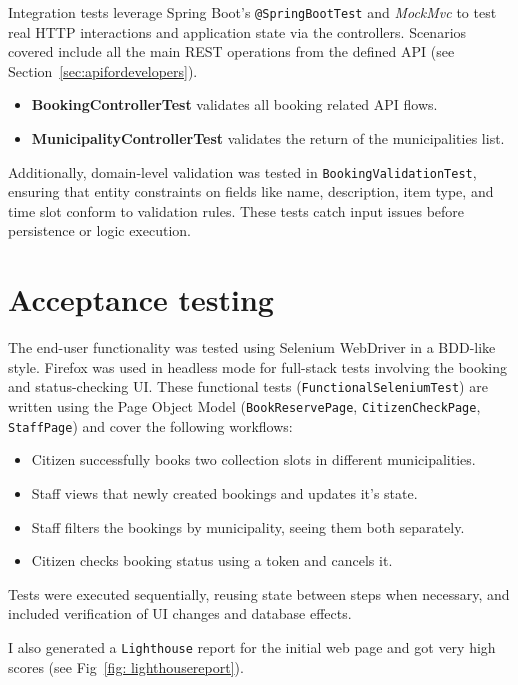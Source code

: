 \documentclass[code,math]{relatorio-deti}
\begin{document}
Integration tests leverage Spring Boot's \texttt{@SpringBootTest} and \textit{MockMvc} to test real HTTP interactions and application state via the controllers. Scenarios covered include all the main REST operations from the defined API (see Section~\ref{sec:apifordevelopers}).

\begin{itemize}
  \item \textbf{BookingControllerTest} validates all booking related API flows.

  \item \textbf{MunicipalityControllerTest} validates the return of the municipalities list.
\end{itemize}

Additionally, domain-level validation was tested in \texttt{BookingValidationTest}, ensuring that entity constraints on fields like name, description, item type, and time slot conform to validation rules. These tests catch input issues before persistence or logic execution.

\section{Acceptance testing}

The end-user functionality was tested using Selenium WebDriver in a BDD-like style. Firefox was used in headless mode for full-stack tests involving the booking and status-checking UI. These functional tests (\texttt{FunctionalSeleniumTest}) are written using the Page Object Model (\texttt{BookReservePage}, \texttt{CitizenCheckPage}, \texttt{StaffPage}) and cover the following workflows:

\begin{itemize}
  \item Citizen successfully books two collection slots in different municipalities.
  \item Staff views that newly created bookings and updates it's state.
  \item Staff filters the bookings by municipality, seeing them both separately.
  \item Citizen checks booking status using a token and cancels it.
\end{itemize}

Tests were executed sequentially, reusing state between steps when necessary, and included verification of UI changes and database effects.

I also generated a \texttt{Lighthouse} report for the initial web page and got very high scores (see Fig~\ref{fig: lighthousereport}).
\end{document}
